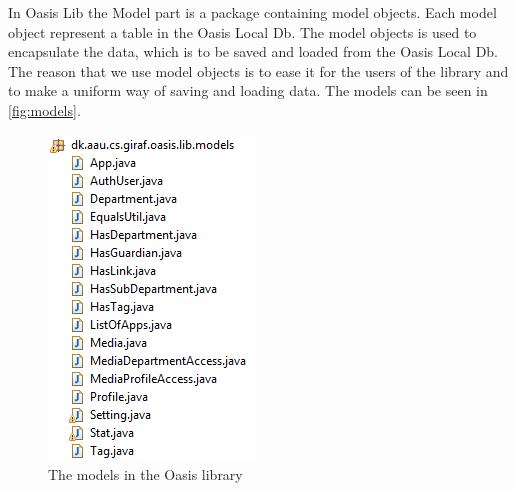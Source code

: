 In Oasis Lib the Model part is a package containing model objects. Each model object represent a table in the Oasis Local Db.
The model objects is used to encapsulate the data, which is to be saved and loaded from the Oasis Local Db.
The reason that we use model objects is to ease it for the users of the library and to make a uniform way of saving and loading data.
The models can be seen in \autoref{fig:models}.
\begin{figure}
	\centering
		\includegraphics[width=\textwidth]{images/models.png}
	\caption{The models in the Oasis library}
	\label{fig:controllers}
\end{figure}

